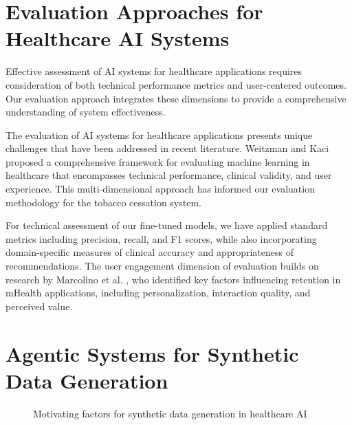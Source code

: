 \section{Evaluation Approaches for Healthcare AI Systems}
\begin{tcolorbox}[colback=gray!5!white,colframe=gray!75!black,title=Multi-dimensional Evaluation Framework]
Effective assessment of AI systems for healthcare applications requires consideration of both technical performance metrics and user-centered outcomes. Our evaluation approach integrates these dimensions to provide a comprehensive understanding of system effectiveness.
\end{tcolorbox}

The evaluation of AI systems for healthcare applications presents unique challenges that have been addressed in recent literature. Weitzman and Kaci \cite{HealthcareMetrics} proposed a comprehensive framework for evaluating machine learning in healthcare that encompasses technical performance, clinical validity, and user experience. This multi-dimensional approach has informed our evaluation methodology for the tobacco cessation system.

For technical assessment of our fine-tuned models, we have applied standard metrics including precision, recall, and F1 scores, while also incorporating domain-specific measures of clinical accuracy and appropriateness of recommendations. The user engagement dimension of evaluation builds on research by Marcolino et al. \cite{mHealthEngagement}, who identified key factors influencing retention in mHealth applications, including personalization, interaction quality, and perceived value.

\section{Agentic Systems for Synthetic Data Generation}

\begin{figure}[h]
\centering
{}
\caption{Motivating factors for synthetic data generation in healthcare AI}
\label{fig:data-scarcity-challenge}
\end{figure}


